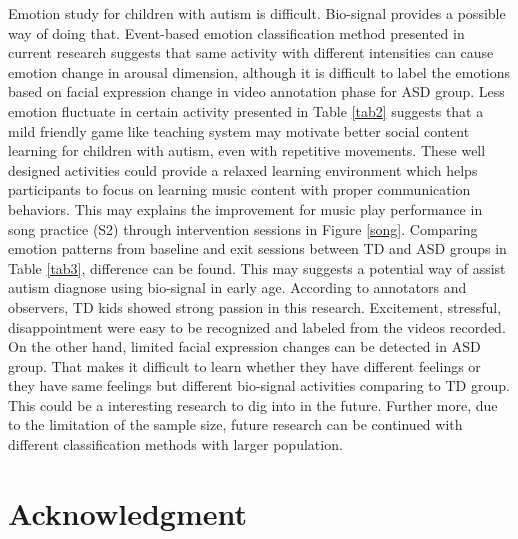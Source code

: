 \documentclass[conference]{IEEEtran}
\begin{document}
Emotion study for children with autism is difficult. Bio-signal provides a possible way of 
doing that. Event-based emotion classification method presented in current research suggests
that same activity with different intensities can cause emotion change in arousal dimension,
although it is difficult to label the emotions based on facial expression change in video
annotation phase for ASD group. Less emotion fluctuate in certain activity presented in Table \ref{tab2} suggests that a mild 
friendly game like teaching system may motivate better social content learning for children with autism, 
even with repetitive movements. These well designed activities could provide a relaxed learning 
environment which helps participants to focus on learning music content with proper communication behaviors. 
This may explains the improvement for music play performance in song practice (S2) through intervention 
sessions in Figure \ref{song}. Comparing emotion patterns from baseline and exit sessions between TD and ASD groups in Table \ref{tab3}, 
difference can be found. This may suggests a potential way of assist autism diagnose using bio-signal 
in early age. According to annotators and observers, TD kids showed strong passion
in this research. Excitement, stressful, disappointment were easy to be recognized and labeled from
the videos recorded. On the other hand, limited facial expression changes can be detected in
ASD group. That makes it difficult to learn whether they have different feelings or they have
same feelings but different bio-signal activities comparing to TD group. This could be a interesting research to
dig into in the future. Further more, due to the limitation of the sample size, future research can be 
continued with different classification methods with larger population.\\

\section*{Acknowledgment}



\baselineskip 0.21in


\end{document}
